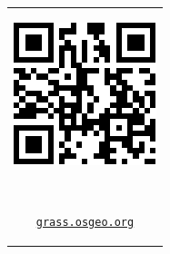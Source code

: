 \documentclass[25pt, margin=0mm, innermargin=15mm, blockverticalspace=15mm, colspace=15mm, subcolspace=8mm]{tikzposter}
\begin{document}
\begin{columns}
{\vspace{-0.2cm}

\textcolor{gray}{
\hrulefill
}

\vspace{-0.1cm}

\newcommand{\qrcodesize}{0.05\linewidth}


\begin{center}
\begin{tabular}{c}


\begin{minipage}{\qrcodesize}
\includegraphics[width=\textwidth]{./images/qr_grass.pdf}
\end{minipage}
~
\begin{minipage}{0.15\linewidth}
\small {\href{http://grass.osgeo.org}{\nolinkurl{grass.osgeo.org}}}
\end{minipage}


\end{tabular}
\end{center}}
\end{columns}
\end{document}
